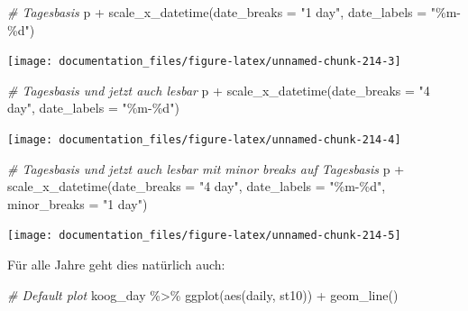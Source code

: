 \documentclass[
]{article}
\newenvironment{Shaded}{\begin{snugshade}}{\end{snugshade}}
\newcommand{\AttributeTok}[1]{\textcolor[rgb]{0.77,0.63,0.00}{#1}}
\newcommand{\CommentTok}[1]{\textcolor[rgb]{0.56,0.35,0.01}{\textit{#1}}}
\newcommand{\FunctionTok}[1]{\textcolor[rgb]{0.00,0.00,0.00}{#1}}
\newcommand{\NormalTok}[1]{#1}
\newcommand{\SpecialCharTok}[1]{\textcolor[rgb]{0.00,0.00,0.00}{#1}}
\newcommand{\StringTok}[1]{\textcolor[rgb]{0.31,0.60,0.02}{#1}}
\begin{document}
\begin{Shaded}
\begin{Highlighting}[]
\CommentTok{\# Tagesbasis}
\NormalTok{p }\SpecialCharTok{+} \FunctionTok{scale\_x\_datetime}\NormalTok{(}\AttributeTok{date\_breaks =} \StringTok{"1 day"}\NormalTok{, }\AttributeTok{date\_labels =} \StringTok{"\%m{-}\%d"}\NormalTok{)}
\end{Highlighting}
\end{Shaded}

\begin{center}\texttt{[image: documentation\_files/figure-latex/unnamed-chunk-214-3]} \end{center}

\begin{Shaded}
\begin{Highlighting}[]
\CommentTok{\# Tagesbasis und jetzt auch lesbar}
\NormalTok{p }\SpecialCharTok{+} \FunctionTok{scale\_x\_datetime}\NormalTok{(}\AttributeTok{date\_breaks =} \StringTok{"4 day"}\NormalTok{, }\AttributeTok{date\_labels =} \StringTok{"\%m{-}\%d"}\NormalTok{)}
\end{Highlighting}
\end{Shaded}

\begin{center}\texttt{[image: documentation\_files/figure-latex/unnamed-chunk-214-4]} \end{center}

\begin{Shaded}
\begin{Highlighting}[]
\CommentTok{\# Tagesbasis und jetzt auch lesbar mit minor breaks auf Tagesbasis}
\NormalTok{p }\SpecialCharTok{+} \FunctionTok{scale\_x\_datetime}\NormalTok{(}\AttributeTok{date\_breaks =} \StringTok{"4 day"}\NormalTok{, }\AttributeTok{date\_labels =} \StringTok{"\%m{-}\%d"}\NormalTok{, }\AttributeTok{minor\_breaks =} \StringTok{"1 day"}\NormalTok{)}
\end{Highlighting}
\end{Shaded}

\begin{center}\texttt{[image: documentation\_files/figure-latex/unnamed-chunk-214-5]} \end{center}

Für alle Jahre geht dies natürlich auch:

\begin{Shaded}
\begin{Highlighting}[]
\CommentTok{\# Default plot}
\NormalTok{koog\_day }\SpecialCharTok{\%\textgreater{}\%}
  \FunctionTok{ggplot}\NormalTok{(}\FunctionTok{aes}\NormalTok{(daily, st10)) }\SpecialCharTok{+}
  \FunctionTok{geom\_line}\NormalTok{()}
\end{Highlighting}
\end{Shaded}
\end{document}
